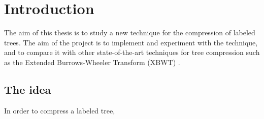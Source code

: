 \chapter{Introduction}
The aim of this thesis is to study a new technique for the compression of labeled trees. The aim of the project is to implement and experiment with the technique, and to compare it with other state-of-the-art techniques for tree compression such as the Extended Burrows-Wheeler Transform (XBWT) \cite{ferragina2009compressing}. 

\section{The idea}
In order to compress a labeled tree, 